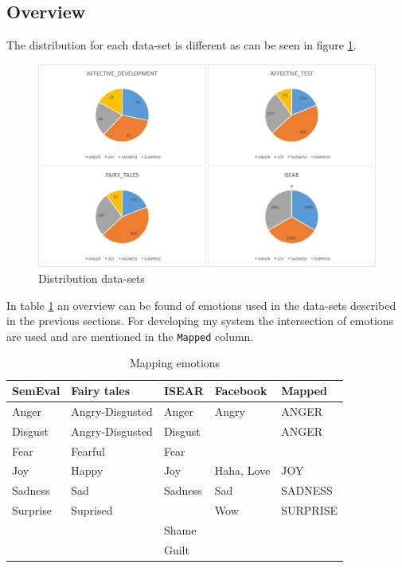 \documentclass[
10pt, %
a4paper, %
oneside, %
headinclude,footinclude, %
BCOR5mm, %
]{scrartcl}
\begin{document}
\subsection{Overview}
The distribution for each data-set is different as can be seen in figure \ref{fig:distribution_data-sets}. 
\begin{figure}[hbt]
  \includegraphics[width=\linewidth]{distribution_data.png}
  \caption{Distribution data-sets}
  \label{fig:distribution_data-sets}
\end{figure}
In table \ref{overview_data-sets} an overview can be found of emotions used in the data-sets described in the previous sections. For developing my system the intersection of emotions are used and are mentioned in the \texttt{Mapped} column.
\begin{table}[htb]
\centering

\begin{tabular}{|l|l|l|l|l|}
\hline
\textbf{SemEval} & \textbf{Fairy tales} & \textbf{ISEAR} & \textbf{Facebook} & \textbf{Mapped} \\ \hline
Anger            & Angry-Disgusted      & Anger               & Angry   & ANGER          \\ \hline
Disgust          & Angry-Disgusted      & Disgust               &    &  ANGER              \\ \hline
Fear             & Fearful              & Fear               &      &              \\ \hline
Joy              & Happy                & Joy                & Haha, Love & JOY\\ \hline
Sadness          & Sad                  & Sadness               & Sad     & SADNESS          \\ \hline
Surprise         & Suprised             &                & Wow          & SURPRISE     \\ 
\hline
                 &                      & Shame               &       &         \\ \hline
                 &                      & Guilt               &       &         \\                  
\hline
\end{tabular}
\caption{Mapping emotions}
\label{overview_data-sets}
\end{table}
\end{document}
